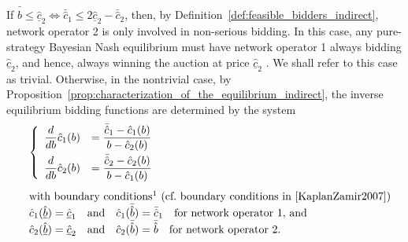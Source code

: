 If $\bar{\hat{b}} \leq \underline{\hat{c}}_2 \iff \bar{\hat{c}}_1 \le 2\underline{\hat{c}}_2 - \bar{\hat{c}}_2$, then, by Definition~\ref{def:feasible_bidders_indirect}, network operator 2 is only involved in non-serious bidding. In this case, any pure-strategy Bayesian Nash equilibrium must have network operator 1 always bidding $\underline{\hat{c}}_2$, and hence, always winning the auction at price $\underline{\hat{c}}_2$ \cite{KaplanZamir2007}. We shall refer to this case as trivial. Otherwise, in the nontrivial case, by Proposition~\ref{prop:characterization_of_the_equilibrium_indirect}, the inverse equilibrium bidding functions are determined by the system
\begin{equation}
  \label{eq:foc_restricted_indirect}
  \begin{array}{ll}
  &\left\{
  \begin{array}{ll}
    \displaystyle\frac{d}{db}\hat{c}_1(b) &= \displaystyle\frac{\bar{\hat{c}}_1 - \hat{c}_1(b)}{b - \hat{c}_2(b)} \\[2ex]
    \displaystyle\frac{d}{db}\hat{c}_2(b) &= \displaystyle\frac{\bar{\hat{c}}_2 - \hat{c}_2(b)}{b - \hat{c}_1(b)}
  \end{array}
  \right.\\[1cm]
  &\textrm{with boundary conditions\footnotemark~(cf.~boundary conditions in~\cite{KaplanZamir2007})}\\
  &\hat{c}_1(\underline{\hat{b}}) = \underline{\hat{c}}_1 \quad\textrm{and}\quad \hat{c}_1(\bar{\hat{b}}) = \bar{\hat{c}}_1 \quad\textrm{for network operator 1, and}\\
  &\hat{c}_2(\underline{\hat{b}}) = \underline{\hat{c}}_2 \quad\textrm{and}\quad \hat{c}_2(\bar{\hat{b}}) = \bar{\hat{b}} \quad\textrm{for network operator 2.}
  \end{array}
\end{equation}


